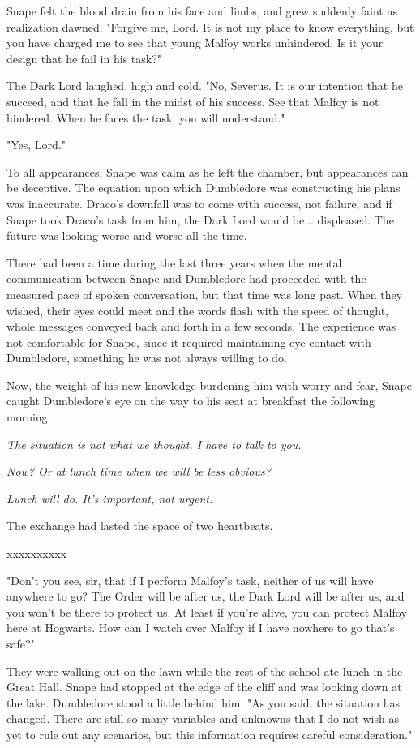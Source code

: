 \documentclass[a4paper,11pt]{article}
\begin{document}
Snape felt the blood drain from his face and limbs, and grew suddenly faint as realization dawned. "Forgive me, Lord. It is not my place to know everything, but you have charged me to see that young Malfoy works unhindered. Is it your design that he fail in his task?"

The Dark Lord laughed, high and cold. "No, Severus. It is our intention that he succeed, and that he fall in the midst of his success. See that Malfoy is not hindered. When he faces the task, you will understand."

"Yes, Lord."

To all appearances, Snape was calm as he left the chamber, but appearances can be deceptive. The equation upon which Dumbledore was constructing his plans was inaccurate. Draco's downfall was to come with success, not failure, and if Snape took Draco's task from him, the Dark Lord would be... displeased. The future was looking worse and worse all the time.

There had been a time during the last three years when the mental communication between Snape and Dumbledore had proceeded with the measured pace of spoken conversation, but that time was long past. When they wished, their eyes could meet and the words flash with the speed of thought, whole messages conveyed back and forth in a few seconds. The experience was not comfortable for Snape, since it required maintaining eye contact with Dumbledore, something he was not always willing to do.

Now, the weight of his new knowledge burdening him with worry and fear, Snape caught Dumbledore's eye on the way to his seat at breakfast the following morning.

\emph{The situation is not what we thought. I have to talk to you.}

\emph{Now? Or at lunch time when we will be less obvious?}

\emph{Lunch will do. It's important, not urgent.}

The exchange had lasted the space of two heartbeats.

xxxxxxxxxx

"Don't you see, sir, that if I perform Malfoy's task, neither of us will have anywhere to go? The Order will be after us, the Dark Lord will be after us, and you won't be there to protect us. At least if you're alive, you can protect Malfoy here at Hogwarts. How can I watch over Malfoy if I have nowhere to go that's safe?"

They were walking out on the lawn while the rest of the school ate lunch in the Great Hall. Snape had stopped at the edge of the cliff and was looking down at the lake. Dumbledore stood a little behind him. "As you said, the situation has changed. There are still so many variables and unknowns that I do not wish as yet to rule out any scenarios, but this information requires careful consideration."
\end{document}

